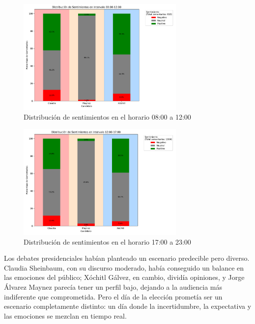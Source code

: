 \documentclass[10pt, a4paper]{article}
\begin{document}
	
	\begin{figure}[h!] %
		\centering
		\includegraphics[width=0.73\textwidth]{sA_intervalo_0812.pdf} %
		\caption{Distribución de sentimientos en el horario 08:00 a 12:00} %
		\label{fig:sA_08a12} %
	\end{figure}
	
	\begin{figure}[h!] %
		\centering
		\includegraphics[width=0.73\textwidth]{sA_intervalo_1217.pdf} %
		\caption{Distribución de sentimientos en el horario 17:00 a 23:00} %
		\label{fig:sA_12a17} %
	\end{figure}
	
	Los debates presidenciales habían planteado un escenario predecible pero diverso. Claudia Sheinbaum, con su discurso moderado, había conseguido un balance en las emociones del público; Xóchitl Gálvez, en cambio, dividía opiniones, y Jorge Álvarez Maynez parecía tener un perfil bajo, dejando a la audiencia más indiferente que comprometida. Pero el día de la elección prometía ser un escenario completamente distinto: un día donde la incertidumbre, la expectativa y las emociones se mezclan en tiempo real.
	
\end{document}

